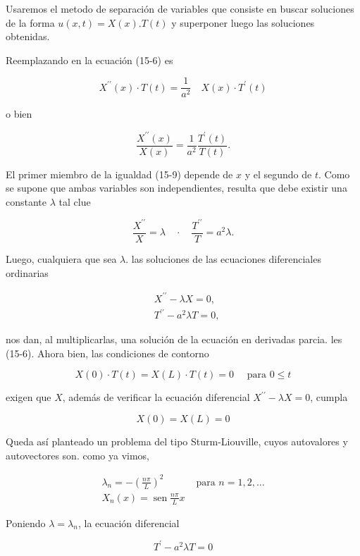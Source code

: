 \documentclass[10pt]{article}
\theoremstyle{plain}
\theoremstyle{definition}
\theoremstyle{remark}
\begin{document}
Usaremos el metodo de separación de variables que consiste en buscar soluciones de la forma $u(x, t)=X(x) . T(t)$ y superponer luego las soluciones obtenidas.

Reemplazando en la ecuación (15-6) es

$$
X^{\prime \prime}(x) \cdot T(t)=\frac{1}{a^{2}} \quad X(x) \cdot T^{\prime}(t)
$$

o bien


\begin{equation*}
\frac{X^{\prime \prime}(x)}{X(x)}=\frac{1}{a^{2}} \frac{T^{\prime}(t)}{T(t)} . \tag{15.9}
\end{equation*}


El primer miembro de la igualdad (15-9) depende de $x$ y el segundo de $t$. Como se supone que ambas variables son independientes, resulta que debe existir una constante $\lambda$ tal clue

$$
\frac{X^{\prime \prime}}{X}=\lambda \quad \cdot \quad \frac{T^{\prime \prime}}{T}=a^{2} \lambda .
$$

Luego, cualquiera que sea $\lambda$. las soluciones de las ecuaciones diferenciales ordinarias

$$
\begin{aligned}
& X^{\prime \prime}-\lambda X=0, \\
& T^{\prime \prime}-a^{2} \lambda T=0,
\end{aligned}
$$

nos dan, al multiplicarlas, una solución de la ecuación en derivadas parcia. les (15-6). Ahora bien, las condiciones de contorno

$$
X(0) \cdot T(t)=X(L) \cdot T(t)=0 \quad \text { para } 0 \leqslant t
$$

exigen que $X$, además de verificar la ecuación diferencial $X^{\prime \prime}-\lambda X=0$, cumpla

$$
X(0)=X(L)=0
$$

Queda así planteado un problema del tipo Sturm-Liouville, cuyos autovalores y autovectores son. como ya vimos,

$$
\begin{array}{ll}
\lambda_{n}=-\left(\frac{n \pi}{L}\right)^{2} & \text { para } n=1,2, \ldots \\
X_{n}(x)=\operatorname{sen} \frac{n \pi}{L} x &
\end{array}
$$

Poniendo $\lambda=\lambda_{n}$, la ecuación diferencial

$$
T^{\prime}-a^{2} \lambda T=0
$$
\end{document}
